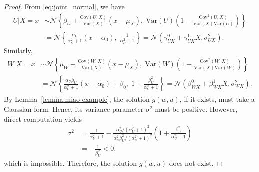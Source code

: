 \documentclass[
  12pt]{article}
\def\cN{\mathcal{N}}
\begin{document}
\begin{proof}
From \eqref{eq:joint_normal}, we have
\begin{align*}
U | X = x 
&\sim \mathcal{N}\left\{ 
\beta_U + \frac{\mathrm{Cov}(U,X)}{\mathrm{Var}(X)}(x - \mu_X),\;
\mathrm{Var}(U)\left(1 - \frac{\mathrm{Cov}^2(U,X)}{\mathrm{Var}(X)\mathrm{Var}(U)}\right)
\right\} \\
&= \mathcal{N}\left\{
\frac{\alpha_U}{\alpha_U^2 + 1}(x - \alpha_0),\;
\frac{1}{\alpha_U^2 + 1}
\right\}=\cN(\gamma^0_{UX}+\gamma^1_{UX}X,\sigma_{UX}^{2}).
\end{align*}
Similarly,
\begin{align*}
W| X = x 
&\sim \mathcal{N}\left\{
\mu_W + \frac{\mathrm{Cov}(W,X)}{\mathrm{Var}(X)}(x - \mu_X),\;
\mathrm{Var}(W)\left(1 - \frac{\mathrm{Cov}^2(W,X)}{\mathrm{Var}(X)\mathrm{Var}(W)}\right)
\right\} \\
&= \mathcal{N}\left\{
\frac{\alpha_U \beta_U}{\alpha_U^2 + 1}(x - \alpha_0) + \beta_0,\;
1 + \frac{\beta_U^2}{\alpha_U^2 + 1}
\right\}=\mathcal{N}(\beta_{WX}^0+\beta_{WX}^1X,\sigma_{WX}^{2}).
\end{align*}
By Lemma~\ref{lemma.miao-example}, the solution $g(w,u)$, if it exists, must take a Gaussian form. Hence, its variance parameter $\sigma^2$ must be positive. However, direct computation yields
\begin{align*}
    \sigma^2&=\frac{1}{\alpha_U^2 + 1}-\frac{\alpha_U^2/(\alpha_U^2+1)^2}{\alpha_U^2\beta_U^2/(\alpha_U^2+1)^2}\left(1 + \frac{\beta_U^2}{\alpha_U^2 + 1}\right)\\
    &=-\frac{1}{\beta_U^2}<0,
\end{align*}
which is impossible. Therefore, the solution $g(w,u)$ does not exist.
\end{proof}
\end{document}
